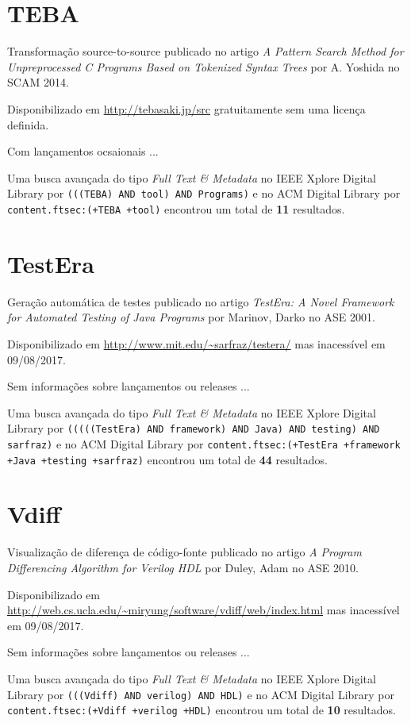 \section{TEBA}

Transformação source-to-source
publicado no artigo {\it A Pattern Search Method for Unpreprocessed C Programs Based on Tokenized Syntax Trees}
por A. Yoshida
no SCAM 2014.

Disponibilizado em \url{http://tebasaki.jp/src}
gratuitamente
sem uma licença definida.

Com lançamentos ocsaionais ...


Uma busca avançada do tipo {\it Full Text \& Metadata} no IEEE Xplore Digital Library por
\texttt{(((TEBA) AND tool) AND Programs)}
e no ACM Digital Library por
\texttt{content.ftsec:(+TEBA +tool)}
encontrou um total de
{\bf 11}
resultados.

\section{TestEra}

Geração automática de testes
publicado no artigo {\it TestEra: A Novel Framework for Automated Testing of Java Programs}
por Marinov, Darko
no ASE 2001.

Disponibilizado em \url{http://www.mit.edu/~sarfraz/testera/}
mas inacessível em 09/08/2017.

Sem informações sobre lançamentos ou releases ...


Uma busca avançada do tipo {\it Full Text \& Metadata} no IEEE Xplore Digital Library por
\texttt{(((((TestEra) AND framework) AND Java) AND testing) AND sarfraz)}
e no ACM Digital Library por
\texttt{content.ftsec:(+TestEra +framework +Java +testing +sarfraz)}
encontrou um total de
{\bf 44}
resultados.

\section{Vdiff}

Visualização de diferença de código-fonte
publicado no artigo {\it A Program Differencing Algorithm for Verilog HDL}
por Duley, Adam
no ASE 2010.

Disponibilizado em \url{http://web.cs.ucla.edu/~miryung/software/vdiff/web/index.html}
mas inacessível em 09/08/2017.

Sem informações sobre lançamentos ou releases ...


Uma busca avançada do tipo {\it Full Text \& Metadata} no IEEE Xplore Digital Library por
\texttt{(((Vdiff) AND verilog) AND HDL)}
e no ACM Digital Library por
\texttt{content.ftsec:(+Vdiff +verilog +HDL)}
encontrou um total de
{\bf 10}
resultados.

